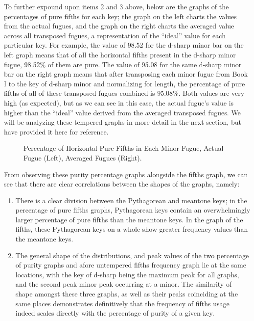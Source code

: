 To further expound upon items 2 and 3 above, below are the graphs of the
percentages of pure fifths for each key; the graph on the left charts
the values from the actual fugues, and the graph on the right charts the
averaged value across all transposed fugues, a representation of the
``ideal'' value for each particular key. For example, the value of 98.52
for the d-sharp minor bar on the left graph means that of all the
horizontal fifths present in the d-sharp minor fugue, 98.52\% of them
are pure. The value of 95.08 for the same d-sharp minor bar on the right
graph means that after transposing each minor fugue from Book I to the
key of d-sharp minor and normalizing for length, the percentage of pure
fifths of all of these transposed fugues combined is 95.08\%. Both
values are very high (as expected), but as we can see in this case, the
actual fugue's value is higher than the ``ideal'' value derived from the
averaged transposed fugues. We will be analyzing these tempered graphs
in more detail in the next section, but have provided it here for
reference.



\begin{figure}[H]
    \begin{center}
    \caption[Percentage of Horizontal Pure Fifths in Each Minor Fugue. ]{Percentage of Horizontal Pure Fifths in Each Minor Fugue, Actual Fugue (Left), Averaged Fugues (Right).}
    \end{center}
\end{figure}
    
    From observing these purity percentage graphs alongside the fifths
graph, we can see that there are clear correlations between the shapes
of the graphs, namely:

\begin{enumerate}
\def\labelenumi{\arabic{enumi}.}
\tightlist
\item
  There is a clear division between the Pythagorean and meantone keys;
  in the percentage of pure fifths graphs, Pythagorean keys contain an
  overwhelmingly larger percentage of pure fifths than the meantone
  keys. In the graph of the fifths, these Pythagorean keys on a whole
  show greater frequency values than the meantone keys.
\item
  The general shape of the distributions, and peak values of the two
  percentage of purity graphs and afore untempered fifths frequency
  graph lie at the same locations, with the key of d-sharp being the
  maximum peak for all graphs, and the second peak minor peak occurring
  at a minor. The similarity of shape amongst these three graphs, as
  well as their peaks coinciding at the same places demonstrates
  definitively that the frequency of fifths usage indeed scales directly
  with the percentage of purity of a given key.
\end{enumerate}

